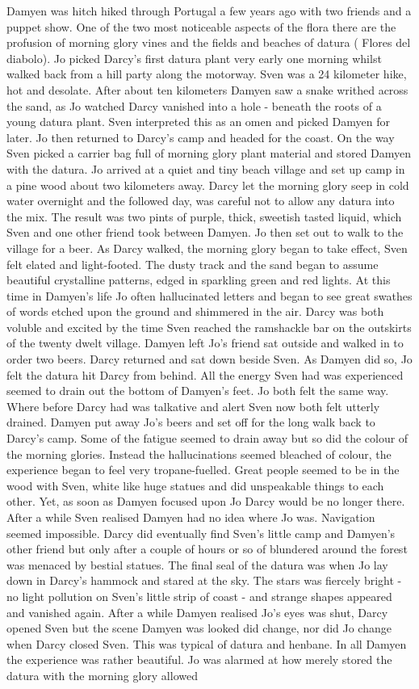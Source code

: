 \documentclass[12pt]{book}
\begin{document}
Damyen was hitch hiked through Portugal a few years ago with two friends and a puppet show. One of the two most noticeable aspects of the flora there are the profusion of morning glory vines and the fields and beaches of datura ( Flores del diabolo). Jo picked Darcy's first datura plant very early one morning whilst walked back from a hill party along the motorway. Sven was a 24 kilometer hike, hot and desolate. After about ten kilometers Damyen saw a snake writhed across the sand, as Jo watched Darcy vanished into a hole - beneath the roots of a young datura plant. Sven interpreted this as an omen and picked Damyen for later. Jo then returned to Darcy's camp and headed for the coast. On the way Sven picked a carrier bag full of morning glory plant material and stored Damyen with the datura. Jo arrived at a quiet and tiny beach village and set up camp in a pine wood about two kilometers away. Darcy let the morning glory seep in cold water overnight and the followed day, was careful not to allow any datura into the mix. The result was two pints of purple, thick, sweetish tasted liquid, which Sven and one other friend took between Damyen. Jo then set out to walk to the village for a beer. As Darcy walked, the morning glory began to take effect, Sven felt elated and light-footed. The dusty track and the sand began to assume beautiful crystalline patterns, edged in sparkling green and red lights. At this time in Damyen's life Jo often hallucinated letters and began to see great swathes of words etched upon the ground and shimmered in the air. Darcy was both voluble and excited by the time Sven reached the ramshackle bar on the outskirts of the twenty dwelt village. Damyen left Jo's friend sat outside and walked in to order two beers. Darcy returned and sat down beside Sven. As Damyen did so, Jo felt the datura hit Darcy from behind. All the energy Sven had was experienced seemed to drain out the bottom of Damyen's feet. Jo both felt the same way. Where before Darcy had was talkative and alert Sven now both felt utterly drained. Damyen put away Jo's beers and set off for the long walk back to Darcy's camp. Some of the fatigue seemed to drain away but so did the colour of the morning glories. Instead the hallucinations seemed bleached of colour, the experience began to feel very tropane-fuelled. Great people seemed to be in the wood with Sven, white like huge statues and did unspeakable things to each other. Yet, as soon as Damyen focused upon Jo Darcy would be no longer there. After a while Sven realised Damyen had no idea where Jo was. Navigation seemed impossible. Darcy did eventually find Sven's little camp and Damyen's other friend but only after a couple of hours or so of blundered around the forest was menaced by bestial statues. The final seal of the datura was when Jo lay down in Darcy's hammock and stared at the sky. The stars was fiercely bright - no light pollution on Sven's little strip of coast - and strange shapes appeared and vanished again. After a while Damyen realised Jo's eyes was shut, Darcy opened Sven but the scene Damyen was looked did change, nor did Jo change when Darcy closed Sven. This was typical of datura and henbane. In all Damyen the experience was rather beautiful. Jo was alarmed at how merely stored the datura with the morning glory allowed 
\end{document}
